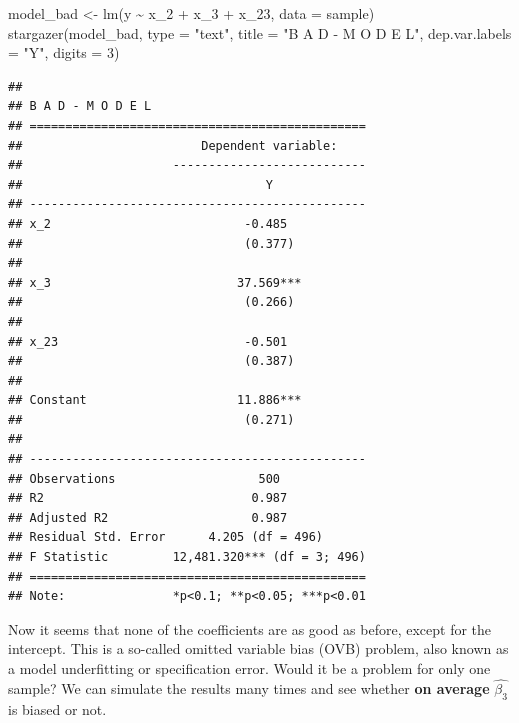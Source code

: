 \documentclass[
]{book}
\newenvironment{Shaded}{\begin{snugshade}}{\end{snugshade}}
\newcommand{\AttributeTok}[1]{\textcolor[rgb]{0.77,0.63,0.00}{#1}}
\newcommand{\DecValTok}[1]{\textcolor[rgb]{0.00,0.00,0.81}{#1}}
\newcommand{\FunctionTok}[1]{\textcolor[rgb]{0.00,0.00,0.00}{#1}}
\newcommand{\NormalTok}[1]{#1}
\newcommand{\OtherTok}[1]{\textcolor[rgb]{0.56,0.35,0.01}{#1}}
\newcommand{\SpecialCharTok}[1]{\textcolor[rgb]{0.00,0.00,0.00}{#1}}
\newcommand{\StringTok}[1]{\textcolor[rgb]{0.31,0.60,0.02}{#1}}
\begin{document}
\begin{Shaded}
\begin{Highlighting}[]
\NormalTok{model\_bad }\OtherTok{\textless{}{-}} \FunctionTok{lm}\NormalTok{(y }\SpecialCharTok{\textasciitilde{}}\NormalTok{ x\_2 }\SpecialCharTok{+}\NormalTok{ x\_3 }\SpecialCharTok{+}\NormalTok{ x\_23, }\AttributeTok{data =}\NormalTok{ sample)}
\FunctionTok{stargazer}\NormalTok{(model\_bad, }\AttributeTok{type =} \StringTok{"text"}\NormalTok{, }\AttributeTok{title =} \StringTok{"B A D {-} M O D E L"}\NormalTok{,}
          \AttributeTok{dep.var.labels =} \StringTok{"Y"}\NormalTok{,}
          \AttributeTok{digits =} \DecValTok{3}\NormalTok{)}
\end{Highlighting}
\end{Shaded}

\begin{verbatim}
## 
## B A D - M O D E L
## ===============================================
##                         Dependent variable:    
##                     ---------------------------
##                                  Y             
## -----------------------------------------------
## x_2                           -0.485           
##                               (0.377)          
##                                                
## x_3                          37.569***         
##                               (0.266)          
##                                                
## x_23                          -0.501           
##                               (0.387)          
##                                                
## Constant                     11.886***         
##                               (0.271)          
##                                                
## -----------------------------------------------
## Observations                    500            
## R2                             0.987           
## Adjusted R2                    0.987           
## Residual Std. Error      4.205 (df = 496)      
## F Statistic         12,481.320*** (df = 3; 496)
## ===============================================
## Note:               *p<0.1; **p<0.05; ***p<0.01
\end{verbatim}

Now it seems that none of the coefficients are as good as before, except for the intercept. This is a so-called omitted variable bias (OVB) problem, also known as a model underfitting or specification error. Would it be a problem for only one sample? We can simulate the results many times and see whether \textbf{on average} \(\hat{\beta_3}\) is biased or not.
\end{document}
